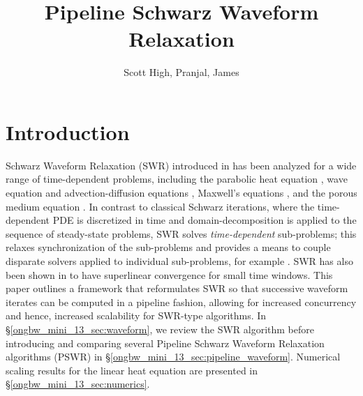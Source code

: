 \documentclass{svmult-ddm}
\begin{document}
\title*{Pipeline Schwarz Waveform Relaxation}

\author{Scott High, Pranjal, James}

\maketitle



\section{Introduction}
\label{ongbw_mini_13_sec:introduction}

Schwarz Waveform Relaxation (SWR) introduced in \cite{bjorhus1995} has
been analyzed for a wide range of time-dependent problems, including
the parabolic heat equation \cite{MR1638096}, wave equation and
advection-diffusion equations \cite{gander1999,MR1941398}, Maxwell's
equations \cite{courvoisier2013}, and the porous medium equation
\cite{japhet2013}.  In contrast to classical Schwarz iterations, where
the time-dependent PDE is discretized in time and domain-decomposition
is applied to the sequence of steady-state problems, SWR solves {\em
  time-dependent} sub-problems; this relaxes synchronization of the
sub-problems and provides a means to couple disparate solvers applied
to individual sub-problems, for example \cite{lemarie:hal-00872496}.
SWR has also been shown in \cite{MR1941398, MR2448703} to have
superlinear convergence for small time windows.  This paper outlines a
framework that reformulates SWR so that successive waveform iterates
can be computed in a pipeline fashion, allowing for increased
concurrency and hence, increased scalability for SWR-type algorithms.
In \S\ref{ongbw_mini_13_sec:waveform}, we review the SWR algorithm
before introducing and comparing several Pipeline Schwarz Waveform
Relaxation algorithms (PSWR) in
\S\ref{ongbw_mini_13_sec:pipeline_waveform}.  Numerical scaling
results for the linear heat equation are presented in
\S\ref{ongbw_mini_13_sec:numerics}.
\end{document}
